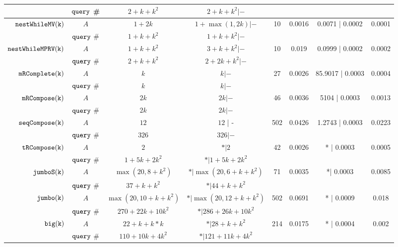 \begin {table}[H]
\begin{center}
{\begin{tabular}{ r | c | c | c | c | c | c | c  }
         & ${\tt query}$ \#   & {$2 + k + k^2$} &  $2 + k + k^2| -$ & & & & \\
         \hline
         $  \mathtt{nestWhileMV(k)}$ 
         & $A$ & $1 + 2k $ & $1 + \max(1,2k) | -$  & 10 & 0.0016 & 0.0071 | 0.0002 & 0.0001 \\
         \cline{2-4}
         & ${\tt query}$ \#   & {$1 + k + k^2$} &  $1 + k + k^2 |-$  & & & & \\
         \hline
         \multirow{2}{*}{$\mathtt{nestWhileMPRV(k)}$}
         & $A$  &  $1 + k + k^2$ &  $3 + k + k^2| -$  &  10 & 0.019 & 0.0999 | 0.0002 & 0.0002 \\
         \cline{2-4}
         & ${\tt query}$ \#   & $2 + k + k^2 $ & $2 + 2k + k^2 | - $  & & & & \\
         \hline
         $  \mathtt{mRComplete(k)}$ 
         & $A$ & $k$ & $ k | -  $   &  27 & 0.0026 & 85.9017 | 0.0003 & 0.0004 \\
         \cline{2-4}
         & ${\tt query}$ \#   & $k$ & $k |-$   & & & & \\
         \hline
         $  \mathtt{mRCompose(k)}$ 
         & $A$ & $2k$ & $  2k | -$   &  46 & 0.0036 & 5104 | 0.0003 &  0.0013\\
         \cline{2-4}
         & ${\tt query}$ \#   & {$2k$} & $ 2k | -$   & & & & \\
         \hline
         $  \mathtt{seqCompose(k)}$ 
         & $A$ & $12$ & $12  $ | -  &  502 & 0.0426  & 1.2743 | 0.0003 & 0.0223 \\
         \cline{2-4}
         & ${\tt query}$ \#   & $326$ & $326 | -$   & & & & \\
         \hline
         \multirow{2}{*}{$\mathtt{tRCompose(k)}$} 
         & $A$ & $2$ &  $ * | 2$   &  42 & 0.0026 & * | 0.0003 & 0.0005\\
         \cline{2-4}
         & ${\tt query}$ \#   & $1 + 5k + 2 k^2 $ & $* | 1 + 5k + 2 k^2 $  & & & & \\
         \hline
         \multirow{2}{*}{$\mathtt{{jumboS(k)}}$}
         & $A$ & $ \max(20, 8+k^2)$ &  {$ * | \max(20, 6+k+k^2)$}    &  71 & 0.0035 & *| 0.0003 &  0.0085 \\
         \cline{2-4}
         & ${\tt query}$ \#   & $37+k+k^2 $ & $* | {44+k+k^2}$  & & & & \\
         \hline
         \multirow{2}{*}{$\mathtt{jumbo(k)}$}
         & $A$ & $ \max(20, 10+k+k^2 )$    &  $* | \max(20, 12 + k+ k^2)$   &  502 & 0.0691 & * | 0.0009 & 0.018 \\
         \cline{2-4}
         & ${\tt query}$ \#   & $270 + 22k + 10k^2 $ & $* | 286+26k+10k^2$  & & & & \\
         \hline
         \multirow{2}{*}{$\mathtt{big(k)}$} 
         & $A$ &  $22+k+k*k$  &  $* |28 + k + k^2 $ &  214 & 0.0175 & * | 0.0004 & 0.002 \\
         \cline{2-4}
         & ${\tt query}$ \#   & $110+10k+4k^2$ & $* |121+11k+4k^2 $   & & & & \\
         \hline
        \end{tabular}
}
\end{center}
\end{table}